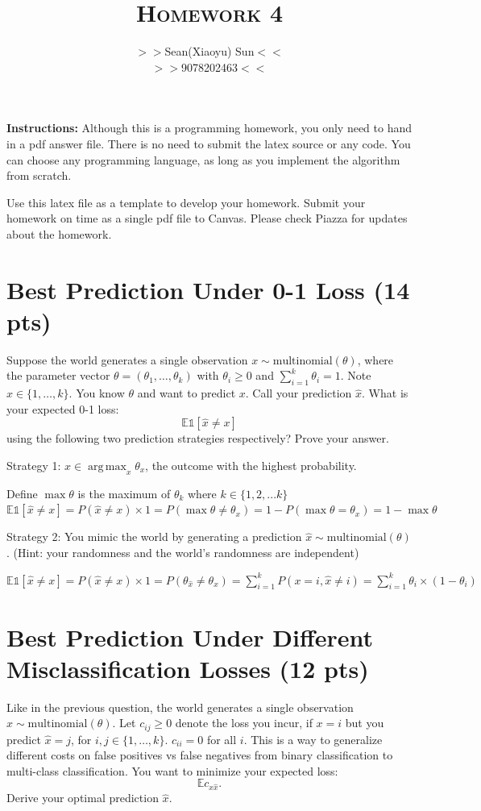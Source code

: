 \documentclass[a4paper]{article}
\title{\textsc{Homework 4}} %
\author{
$>>$Sean(Xiaoyu) Sun$<<$\\
$>>$9078202463$<<$\\
}
\date{}
\theoremstyle{definition}
\DeclareMathOperator*{\argmax}{arg\,max}
\def\E{\mathbb E}
\def\ind{\mathds 1}
\newenvironment{soln}{
    \leavevmode\color{blue}\ignorespaces
}{}
\begin{document}
\maketitle 


\textbf{Instructions:} 
Although this is a programming homework, you only need to hand in a pdf answer file.
There is no need to submit the latex source or any code.
You can choose any programming language, as long as you implement the algorithm from scratch. 

Use this latex file as a template to develop your homework.
Submit your homework on time as a single pdf file to Canvas.
Please check Piazza for updates about the homework.

\section{Best Prediction Under 0-1 Loss (14 pts)}
Suppose the world generates a single observation $x \sim \mbox{multinomial}(\theta)$, where the parameter vector $\theta=(\theta_1, \ldots, \theta_k)$ with $\theta_i\ge 0$ and $\sum_{i=1}^k \theta_i=1$.  Note $x \in \{1, \ldots, k\}$.
You know $\theta$ and want to predict $x$. 
Call your prediction $\hat x$.  What is your expected 0-1 loss: 
$$\E \ind[\hat x \neq x]$$
using the following two prediction strategies respectively?  Prove your answer.

Strategy 1: $\hat x \in \argmax_x \theta_x$, the outcome with the highest probability.

\begin{soln}
Define $\max\theta$ is the maximum of $ \theta_k$ where $k \in \{1,2,...k\}$\\
$\E \ind[\hat x \neq x] = P(\hat x \neq x)\times1 = P(\max\theta \neq \theta_x) = 1 - P(\max\theta = \theta_x) = 1 - \max\theta$
\end{soln}

Strategy 2: You mimic the world by generating a prediction $\hat x \sim \mbox{multinomial}(\theta)$.  (Hint: your randomness and the world's randomness are independent)

\begin{soln}
$\E \ind[\hat x \neq x] = P(\hat x \neq x)\times1 = P(\theta_{\hat x} \neq \theta_x) = \sum_{i=1}^k{P(x = i, \hat x \neq i)} = \sum_{i=1}^k{\theta_i \times (1 - \theta_i)}$
\end{soln}

\section{Best Prediction Under Different Misclassification Losses (12 pts)}
Like in the previous question, 
the world generates a single observation $x \sim \mbox{multinomial}(\theta)$.
Let $c_{ij} \ge 0$ denote the loss you incur, if $x=i$ but you predict $\hat x=j$, for $i,j \in \{1, \ldots, k\}$.
$c_{ii}=0$ for all $i$.
This is a way to generalize different costs on false positives vs false negatives from binary classification to multi-class classification.
You want to minimize your expected loss:
$$\E c_{x \hat x}.$$
Derive your optimal prediction $\hat x$.
\end{document}
